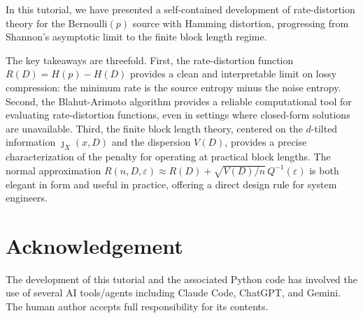 \documentclass[11pt]{article}
\newcommand{\RD}{R(D)}
\newcommand{\Hp}{H(p)}
\newcommand{\HD}{H(D)}
\newcommand{\Ber}{\mathrm{Bernoulli}}
\newcommand{\Qinv}{Q^{-1}}
\begin{document}
In this tutorial, we have presented a self-contained development of
rate-distortion theory for the $\Ber(p)$ source with Hamming distortion,
progressing from Shannon's asymptotic limit to the finite block length regime.

The key takeaways are threefold.
First, the rate-distortion function $\RD = \Hp - \HD$ provides a clean and
interpretable limit on lossy compression: the minimum rate is the source
entropy minus the noise entropy.
Second, the Blahut-Arimoto algorithm provides a reliable computational tool
for evaluating rate-distortion functions, even in settings where closed-form
solutions are unavailable.
Third, the finite block length theory, centered on the $d$-tilted information
$\jmath_X(x, D)$ and the dispersion $V(D)$, provides a precise characterization
of the penalty for operating at practical block lengths.
The normal approximation $R(n, D, \varepsilon) \approx \RD + \sqrt{V(D)/n}\, \Qinv(\varepsilon)$
is both elegant in form and useful in practice, offering a direct design rule
for system engineers.


\section*{Acknowledgement}

The development of this tutorial and the associated Python code has involved
the use of several AI tools/agents including Claude Code, ChatGPT, and Gemini.
The human author accepts full responsibility for its contents.




\end{document}
